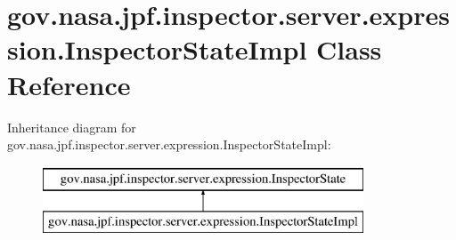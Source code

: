 \hypertarget{classgov_1_1nasa_1_1jpf_1_1inspector_1_1server_1_1expression_1_1_inspector_state_impl}{}\section{gov.\+nasa.\+jpf.\+inspector.\+server.\+expression.\+Inspector\+State\+Impl Class Reference}
\label{classgov_1_1nasa_1_1jpf_1_1inspector_1_1server_1_1expression_1_1_inspector_state_impl}
Inheritance diagram for gov.\+nasa.\+jpf.\+inspector.\+server.\+expression.\+Inspector\+State\+Impl\+:\begin{figure}[H]
\begin{center}
\leavevmode
\includegraphics[height=2.000000cm]{classgov_1_1nasa_1_1jpf_1_1inspector_1_1server_1_1expression_1_1_inspector_state_impl}
\end{center}
\end{figure}
